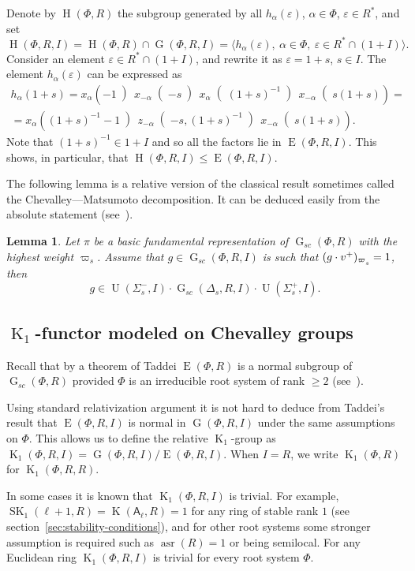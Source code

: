 \documentclass[oneside, 12pt]{amsart}
\theoremstyle{plain}
\numberwithin{equation}{section}
\newtheorem{lemma}{Lemma}
\numberwithin{lemma}{section}
\theoremstyle{definition}
\theoremstyle{remark}
\DeclareMathOperator{\K}{K}
\DeclareMathOperator{\SK}{SK}
\DeclareMathOperator{\G}{G}
\DeclareMathOperator{\E}{E}
\DeclareMathOperator{\Hh}{H}
\DeclareMathOperator{\U}{U}
\DeclareMathOperator{\asr}{asr}
\newcommand{\rA}{\mathsf{A}}
\def\ssub#1{\mathchoice
   {_{\lower2pt\hbox{$\scriptstyle #1$}}}
   {_{\lower2pt\hbox{$\scriptstyle #1$}}}
   {_{\lower1.5pt\hbox{$\scriptscriptstyle #1$}}}
   {_{\!\lower1.5pt\hbox{$\scriptscriptstyle #1$}}}}
\begin{document}
Denote by $\Hh(\Phi, R)$ the subgroup generated by all $h_\alpha(\varepsilon)$, $\alpha\in\Phi$, $\varepsilon\in R^*$, and set
\[ \Hh(\Phi, R, I) = \Hh(\Phi, R)\cap\G(\Phi, R, I)=\langle h_\alpha(\varepsilon), \ \alpha\in\Phi, \ \varepsilon\in R^*\cap(1+I)\rangle. \]
Consider an element $\varepsilon\in R^*\cap(1+I)$, and rewrite it as $\varepsilon=1+s$, $s\in I$. The element $h_\alpha(\varepsilon)$ can be expressed as
\begin{multline} \label{eq:rel-tor-elementary}
h_\alpha(1+s) = x_\alpha\left(-1\middle)\, x_{-\alpha}\middle(-s\middle)\, x_\alpha\middle((1+s)^{-1}\middle)\, x_{-\alpha}\middle(s(1+s)\right) = \\
= x_\alpha\left((1+s)^{-1}-1\middle)\, z_{-\alpha}\middle(-s, (1+s)^{-1}\middle)\, x_{-\alpha}\middle(s(1+s)\right).
\end{multline}
Note that $(1+s)^{-1}\in 1+I$ and so all the factors lie in $\E(\Phi, R, I)$. This shows, in particular, that $\Hh(\Phi, R, I) \leqslant \E(\Phi, R, I)$.

The following lemma is a relative version of the classical result sometimes called the Chevalley---Matsumoto decomposition.
It can be deduced easily from the absolute statement (see~\cite[Theorem~1.3]{St78}).
\begin{lemma}\label{lemma:Chevalley-Matsumoto}
Let $\pi$ be a basic fundamental representation of $\G_{sc}(\Phi, R)$ with the highest weight $\varpi_s$.
Assume that $g\in \G_{sc}(\Phi, R, I)$ is such that $(g\cdot v^+)_{\varpi\ssub{s}}=1$, then 
\[ g \in \U(\Sigma_s^-, I) \cdot \G_{sc}(\Delta_s, R, I) \cdot \U(\Sigma_s^+, I). \]
\end{lemma}

\subsection{$\K_1$-functor modeled on Chevalley groups}
Recall that by a theorem of Taddei $\E(\Phi, R)$ is a normal subgroup of $\G_{sc}(\Phi, R)$ provided $\Phi$ is an irreducible root system of rank $\geqslant 2$ (see~\cite{Ta}).

Using standard relativization argument it is not hard to deduce from Taddei's result that $\E(\Phi, R, I)$ is normal in $\G(\Phi, R, I)$ under the same assumptions on $\Phi$.
This allows us to define the relative $\K_1$-group as $\K_1(\Phi, R, I)=\G(\Phi, R, I)/\E(\Phi, R, I).$
When $I=R$, we write $\K_1(\Phi, R)$ for $\K_1(\Phi, R, R)$.

In some cases it is known that $\K_1(\Phi, R, I)$ is trivial.
For example, $\SK_1(\ell+1, R)=\K(\rA_\ell, R)=1$ for any ring of stable rank $1$ (see section~\ref{sec:stability-conditions}), 
and for other root systems some stronger assumption is required such as $\asr(R)=1$ or being semilocal. 
For any Euclidean ring $\K_1(\Phi, R, I)$ is trivial for every root system $\Phi$.
\end{document}
